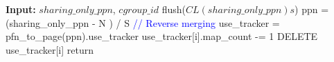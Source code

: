 \documentclass[12pt]{article}
\begin{document}
\setcounter{algorithm}{1}
\begin{algorithm}[H]
\caption{Additional Action during Page Unmapping}
\label{alg:page-unmapping}
\begin{algorithmic}[1]
\STATE \textbf{Input:} $sharing\_only\_ppn$, $cgroup\_id$
\STATE flush($CL(sharing\_only\_ppn)s$)
\STATE ppn = (sharing\_only\_ppn - N ) / S \hfill \textcolor{blue} {// Reverse merging}
\STATE use\_tracker = pfn\_to\_page(ppn).use\_tracker
        \STATE use\_tracker[i].map\_count -= 1
            \STATE DELETE use\_tracker[i]
        \ENDIF
        \STATE return
    \ENDIF
\ENDFOR
\end{algorithmic}
\end{algorithm}
\end{document}
